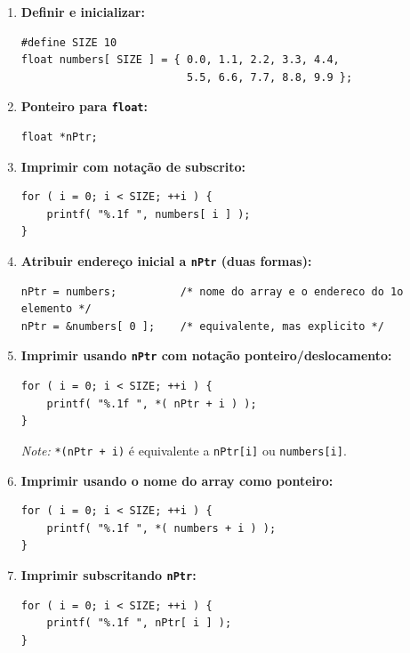 \documentclass[12pt,a4paper]{article}
\begin{document}
\begin{respostabox}
\begin{enumerate}[label=\textbf{\alph*)}]

\item \textbf{Definir e inicializar:}
\begin{lstlisting}
#define SIZE 10
float numbers[ SIZE ] = { 0.0, 1.1, 2.2, 3.3, 4.4,
                          5.5, 6.6, 7.7, 8.8, 9.9 };
\end{lstlisting}

\item \textbf{Ponteiro para \texttt{float}:}
\begin{lstlisting}
float *nPtr;
\end{lstlisting}

\item \textbf{Imprimir com notação de subscrito:}
\begin{lstlisting}
for ( i = 0; i < SIZE; ++i ) {
    printf( "%.1f ", numbers[ i ] );
}
\end{lstlisting}

\item \textbf{Atribuir endereço inicial a \texttt{nPtr} (duas formas):}
\begin{lstlisting}
nPtr = numbers;          /* nome do array e o endereco do 1o elemento */
nPtr = &numbers[ 0 ];    /* equivalente, mas explicito */
\end{lstlisting}

\item \textbf{Imprimir usando \texttt{nPtr} com notação ponteiro/deslocamento:}
\begin{lstlisting}
for ( i = 0; i < SIZE; ++i ) {
    printf( "%.1f ", *( nPtr + i ) );
}
\end{lstlisting}
\textit{Note:} \texttt{*(nPtr + i)} é equivalente a \texttt{nPtr[i]} ou \texttt{numbers[i]}.

\item \textbf{Imprimir usando o nome do array como ponteiro:}
\begin{lstlisting}
for ( i = 0; i < SIZE; ++i ) {
    printf( "%.1f ", *( numbers + i ) );
}
\end{lstlisting}

\item \textbf{Imprimir subscritando \texttt{nPtr}:}
\begin{lstlisting}
for ( i = 0; i < SIZE; ++i ) {
    printf( "%.1f ", nPtr[ i ] );
}
\end{lstlisting}


\end{enumerate}
\end{respostabox}
\end{document}
